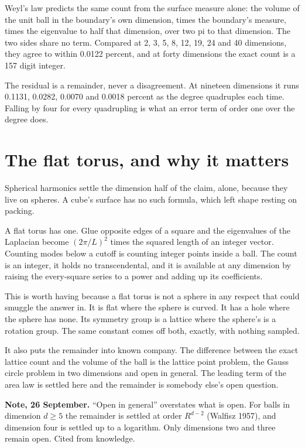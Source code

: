 Weyl's law predicts the same count from the surface measure alone: the volume of the unit ball in the boundary's own dimension, times the boundary's measure, times the eigenvalue to half that dimension, over two pi to that dimension. The two sides share no term. Compared at 2, 3, 5, 8, 12, 19, 24 and 40 dimensions, they agree to within 0.0122 percent, and at forty dimensions the exact count is a 157 digit integer.

The residual is a remainder, never a disagreement. At nineteen dimensions it runs 0.1131, 0.0282, 0.0070 and 0.0018 percent as the degree quadruples each time. Falling by four for every quadrupling is what an error term of order one over the degree does.

\section{The flat torus, and why it matters}

Spherical harmonics settle the dimension half of the claim, alone, because they live on spheres. A cube's surface has no such formula, which left shape resting on packing.

A flat torus has one. Glue opposite edges of a square and the eigenvalues of the Laplacian become $(2\pi/L)^2$ times the squared length of an integer vector. Counting modes below a cutoff is counting integer points inside a ball. The count is an integer, it holds no transcendental, and it is available at any dimension by raising the every-square series to a power and adding up its coefficients.

This is worth having because a flat torus is not a sphere in any respect that could smuggle the answer in. It is flat where the sphere is curved. It has a hole where the sphere has none. Its symmetry group is a lattice where the sphere's is a rotation group. The same constant comes off both, exactly, with nothing sampled.

It also puts the remainder into known company. The difference between the exact lattice count and the volume of the ball is the lattice point problem, the Gauss circle problem in two dimensions and open in general. The leading term of the area law is settled here and the remainder is somebody else's open question.

\textbf{Note, 26 September.} ``Open in general'' overstates what is open. For balls in dimension $d \ge 5$ the remainder is settled at order $R^{d-2}$ (Walfisz 1957), and dimension four is settled up to a logarithm. Only dimensions two and three remain open. Cited from knowledge.

